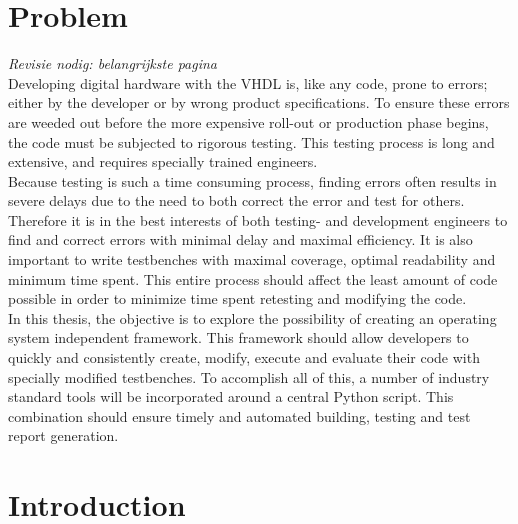 \documentclass[11pt,british]{article}
\begin{document}
\section{Problem}
\emph{\color{red}Revisie nodig: belangrijkste pagina} \\
Developing digital hardware with the \gls{VHDL} is, like any code, prone to errors; either by the developer or by wrong product specifications. To ensure these errors are weeded out before the more expensive roll-out or production phase begins, the code must be subjected to rigorous testing. This testing process is long and extensive, and requires specially trained engineers.
\\[\baselineskip]
Because testing is such a time consuming process, finding errors often results in severe delays due to the need to both correct the error and test for others. Therefore it is in the best interests of both testing- and development engineers to find and correct errors with minimal delay and maximal efficiency. It is also important to write testbenches with maximal coverage, optimal readability and minimum time spent. This entire process should affect the least amount of code possible in order to minimize time spent retesting and modifying the code.
\\[\baselineskip]
In this thesis, the objective is to explore the possibility of creating an operating system independent framework. This framework should allow developers to quickly and consistently create, modify, execute and evaluate their code with specially modified testbenches. To accomplish all of this, a number of industry standard tools will be incorporated around a central Python script. This combination should ensure timely and automated building, testing and test report generation.


\newpage{}


\section{Introduction}
\label{sec:intro}

\end{document}
